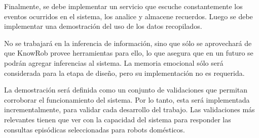 Finalmente, se debe implementar un servicio que escuche constantemente los eventos ocurridos en el sistema, los analice y almacene recuerdos. Luego se debe implementar una demostración del uso de los datos recopilados.

No se trabajará en la inferencia de información, sino que sólo se aprovechará de que KnowRob provee herramientas para ello, lo que asegura que en un futuro se podrán agregar inferencias al sistema. La memoria emocional sólo será considerada para la etapa de diseño, pero su implementación no es requerida.


La demostración será definida como un conjunto de validaciones que permitan corroborar el funcionamiento del sistema. Por lo tanto, esta será implementada incrementalmente, para validar cada desarrollo del trabajo. Las validaciones más relevantes tienen que ver con la capacidad del sistema para responder las consultas episódicas seleccionadas para robots domésticos.







